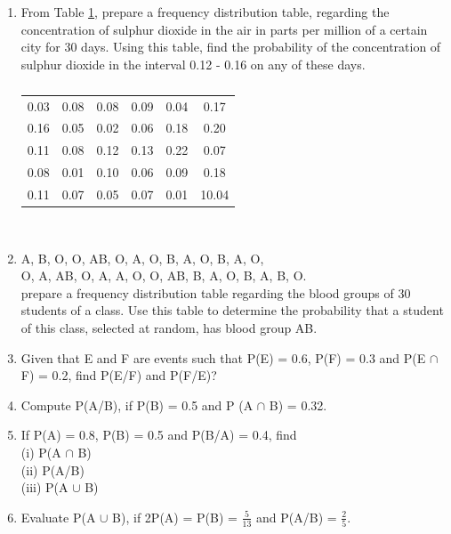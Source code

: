 \begin{enumerate}[label=\arabic*.,ref=\thesubsection.\theenumi]
\item From Table \ref{table:1.2.10}, 
prepare a frequency distribution table, regarding the concentration of sulphur dioxide in the air in parts per million of a certain city for 30 days.   Using this table, find the probability of the concentration of sulphur dioxide in the interval 0.12 - 0.16 on any of these days.
%
\begin{table}[!ht]
\centering
\begin{tabular}{ cccccc} 

  0.03 &0.08 &0.08 &0.09 &0.04 &0.17 \\
 0.16 &0.05 &0.02 &0.06 &0.18 &0.20 \\
 0.11 &0.08 &0.12 &0.13 &0.22 &0.07  \\
 0.08 &0.01 &0.10 &0.06 &0.09 &0.18 \\ 
  0.11 &0.07 &0.05 &0.07 &0.01 &10.04 \\ 
 \end{tabular}\\
\caption{}
\label{table:1.2.10}
\end{table}
%
\item  
A, B, O, O, AB, O, A, O, B, A, O, B, A, O,\\ O,
A, AB, O, A, A, O, O, AB, B, A, O, B, A, B, O.\\
prepare a frequency distribution table regarding the blood groups of 30 students of a class. Use this table to determine the probability that a student of this class, selected at random, has blood group AB.\\
\item Given that E and F are events such that P(E) = 0.6, P(F) = 0.3 and P(E $\cap$ F) = 0.2, find P(E/F) and P(F/E)?\\

\item Compute P(A/B), if P(B) = 0.5 and P (A $\cap$ B) = 0.32.\\

\item If P(A) = 0.8, P(B) = 0.5 and P(B/A) = 0.4, find\\
(i) P(A $\cap$ B)\\
(ii) P(A/B)\\ 
(iii) P(A $\cup$ B)\\

\item Evaluate P(A $\cup$ B), if 2P(A) = P(B)  = $\frac{5}{13}$ and P(A/B) =  $\frac{2}{5}.$\\


\end{enumerate}
